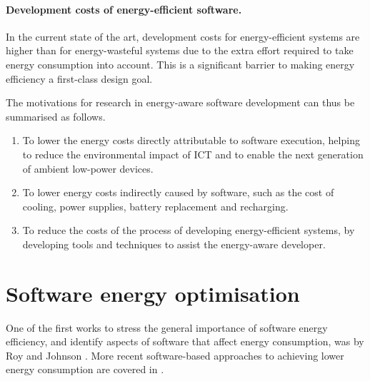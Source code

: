 \documentclass[oneside]{book}
\begin{document}
\paragraph{Development costs of energy-efficient software.} In the current state of the art, development costs for energy-efficient systems are higher than for energy-wasteful systems due to the extra effort required to take energy consumption into account. This is a significant barrier to making energy efficiency a first-class design goal.



The motivations for research in energy-aware software development can thus be summarised as follows.
\begin{enumerate}
\item
To lower the energy costs directly attributable to software execution, helping to reduce the environmental impact of ICT and to enable the next generation of ambient low-power devices.
\item
To lower  energy costs indirectly caused by software, such as the cost of cooling, power supplies, battery replacement and recharging.
\item
To reduce the costs of the process of developing energy-efficient systems, by developing tools and techniques to assist the energy-aware developer.
\end{enumerate}





\nopagebreak
\section{Software energy optimisation}
\label{inefficiency}
 
 
One of the first works to stress the general importance of software energy efficiency, and identify  aspects of software that affect energy consumption, was by Roy and Johnson \cite{Roy_Johnson_1997}. More recent software-based approaches to achieving lower energy consumption are covered in \cite{Larsson2011,Steigerwald_Agrawal_2011}. 
\end{document}
